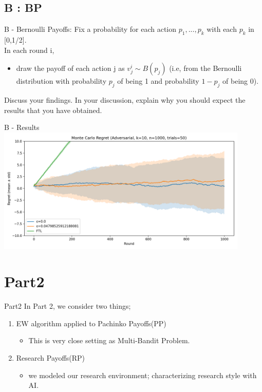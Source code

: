 \documentclass{beamer}
\begin{document}
\subsection{B : BP}
\begin{frame}{B - Bernoulli Payoffs:}
Fix a probability for each action $p_{1},...,p_{k}$ with each $p_{k}$ in [0,1/2].\\
In each round i,
\begin{itemize}
    \item draw the payoff of each action j as $v^{i}_{j} \sim B(p_{j})$ (i.e, from the Bernoulli distribution with probability $p_j$ of being 1 and probability $1-p_{j}$ of being 0).
\end{itemize}
Discuss your findings.  In your discussion, explain why you should expect the results that you have obtained.  
\end{frame}

\begin{frame}{B - Results}
\includegraphics[width=0.9\textwidth]{figures/adv_mc_regret.png}
\end{frame}


\section{Part2}
\begin{frame}{Part2}
In Part 2, we consider two things;
\begin{enumerate}
    \item EW algorithm applied to Pachinko Payoffs(PP)
    \begin{itemize}
        \item This is very close setting as Multi-Bandit Problem.
    \end{itemize}
    \item Research Payoffs(RP)
    \begin{itemize}
        \item we modeled our research environment; characterizing research style with AI.
    \end{itemize}
\end{enumerate}
    
\end{frame}
\end{document}
